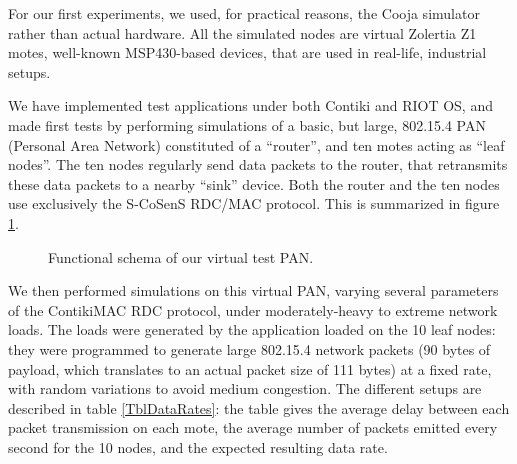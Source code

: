 \documentclass[a4paper,twoside]{article}
\begin{document}
For our first experiments, we used, for practical reasons, the Cooja
simulator rather than actual hardware. All the simulated nodes are
virtual Zolertia Z1 motes, well-known MSP430-based devices, that are
used in real-life, industrial setups.

We have implemented test applications under both Contiki and RIOT OS, and
made first tests by performing simulations of a basic, but large, 802.15.4
PAN (Personal Area Network) constituted of a ``router'', and ten motes
acting as ``leaf nodes''. The ten nodes regularly send data packets to
the router, that retransmits these data packets to a nearby ``sink'' device.
Both the router and the ten nodes use exclusively the S-CoSenS RDC/MAC
protocol. This is summarized in figure \ref{FigPANtest}.

\begin{figure}[!h]
\centering
{}
\caption{Functional schema of our virtual test PAN.}
\label{FigPANtest}
\end{figure}

We then performed simulations on this virtual PAN, varying several parameters
of the ContikiMAC RDC protocol, under moderately-heavy to extreme network
loads. The loads were generated by the application loaded on the 10 leaf
nodes: they were programmed to generate large 802.15.4 network packets
(90 bytes of payload, which translates to an actual packet size of
111 bytes) at a fixed rate, with random variations to avoid
medium congestion. The different setups are described in table
\ref{TblDataRates}: the table gives the average delay between
each packet transmission on each mote, the average number of
packets emitted every second for the 10 nodes, and the expected
resulting data rate.
\end{document}
